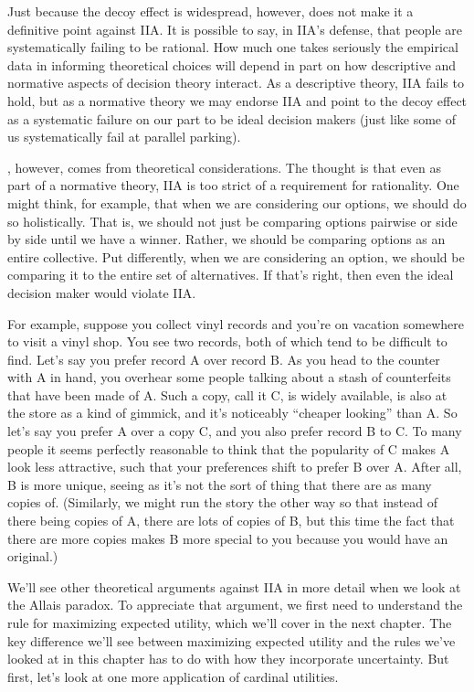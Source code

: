 \documentclass[]{tufte-book}
\begin{document}
Just because the decoy effect is widespread, however, does not make it a definitive point against IIA. It is possible to say, in IIA's defense, that people are systematically failing to be rational. How much one takes seriously the empirical data in informing theoretical choices will depend in part on how descriptive and normative aspects of decision theory interact. As a descriptive theory, IIA fails to hold, but as a normative theory we may endorse IIA and point to the decoy effect as a systematic failure on our part to be ideal decision makers (just like some of us systematically fail at parallel parking).

, however, comes from theoretical considerations. The thought is that even as part of a normative theory, IIA is too strict of a requirement for rationality. One might think, for example, that when we are considering our options, we should do so holistically. That is, we should not just be comparing options pairwise or side by side until we have a winner. Rather, we should be comparing options as an entire collective. Put differently, when we are considering an option, we should be comparing it to the entire set of alternatives. If that's right, then even the ideal decision maker would violate IIA.

For example, suppose you collect vinyl records and you're on vacation somewhere to visit a vinyl shop. You see two records, both of which tend to be difficult to find. Let's say you prefer record A over record B. As you head to the counter with A in hand, you overhear some people talking about a stash of counterfeits that have been made of A. Such a copy, call it C, is widely available, is also at the store as a kind of gimmick, and it's noticeably ``cheaper looking'' than A. So let's say you prefer A over a copy C, and you also prefer record B to C. To many people it seems perfectly reasonable to think that the popularity of C makes A look less attractive, such that your preferences shift to prefer B over A. After all, B is more unique, seeing as it's not the sort of thing that there are as many copies of. (Similarly, we might run the story the other way so that instead of there being copies of A, there are lots of copies of B, but this time the fact that there are more copies makes B more special to you because you would have an original.)

We'll see other theoretical arguments against IIA in more detail when we look at the Allais paradox. To appreciate that argument, we first need to understand the rule for maximizing expected utility, which we'll cover in the next chapter. The key difference we'll see between maximizing expected utility and the rules we've looked at in this chapter has to do with how they incorporate uncertainty. But first, let's look at one more application of cardinal utilities.
\end{document}
